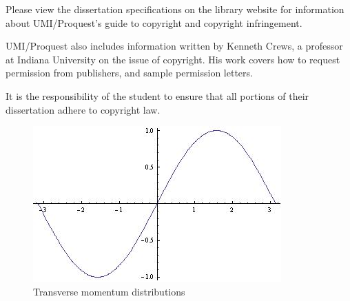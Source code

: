 Please view the dissertation specifications on the library website for information about UMI/Proquest's guide to copyright and copyright infringement. 

UMI/Proquest also includes information written by Kenneth Crews, a professor at Indiana University on the issue of copyright.  His work covers how to request permission from publishers, and sample permission letters.

\Large It is the responsibility of the student to ensure that all portions of their dissertation adhere to copyright law.  


\normalsize 

\begin{figure}[htp]
\centering
\includegraphics{sin_x.jpg}
\caption{Transverse momentum distributions}\label{fig:erptsqfit}
\end{figure}

